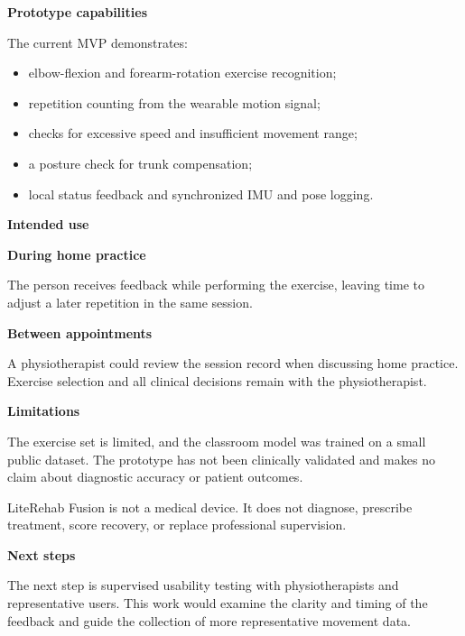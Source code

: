 \documentclass[10pt,a4paper]{article}
\newcommand{\sectionhead}[1]{%
  {\bfseries\color{ReportNavy}\fontsize{13.0}{14.4}\selectfont #1\par}%
  \vspace{1.8mm}%
}
\newcommand{\subhead}[1]{%
  {\bfseries\color{ReportNavy}\fontsize{10.2}{11.4}\selectfont #1\par}%
}
\begin{document}
\begin{minipage}[t]{0.477\linewidth}
  \vspace{0pt}\raggedright

  \sectionhead{Prototype capabilities}
  The current MVP demonstrates:
  \begin{itemize}
    \item elbow-flexion and forearm-rotation exercise recognition;
    \item repetition counting from the wearable motion signal;
    \item checks for excessive speed and insufficient movement range;
    \item a posture check for trunk compensation;
    \item local status feedback and synchronized IMU and pose logging.
  \end{itemize}

  \vspace{6.5mm}
  \sectionhead{Intended use}

  \subhead{During home practice}
  \vspace{0.8mm}
  The person receives feedback while performing the exercise, leaving time to
  adjust a later repetition in the same session.

  \vspace{4.2mm}
  \subhead{Between appointments}
  \vspace{0.8mm}
  A physiotherapist could review the session record when discussing home
  practice. Exercise selection and all clinical decisions remain with the
  physiotherapist.

  \vspace{6.5mm}
  \sectionhead{Limitations}
  The exercise set is limited, and the classroom model was trained on a small
  public dataset. The prototype has not been clinically validated and makes no
  claim about diagnostic accuracy or patient outcomes.

  \vspace{2.3mm}
  LiteRehab Fusion is not a medical device. It does not diagnose, prescribe
  treatment, score recovery, or replace professional supervision.

  \vspace{6.5mm}
  \sectionhead{Next steps}
  The next step is supervised usability testing with physiotherapists and
  representative users. This work would examine the clarity and timing of the
  feedback and guide the collection of more representative movement data.

\end{minipage}
\end{document}

